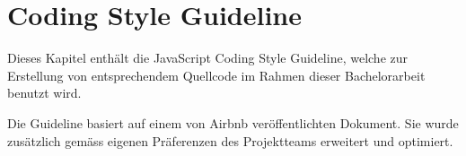 \chapter{Coding Style Guideline}
\label{sec:coding-guidelines}
Dieses Kapitel enthält die JavaScript Coding Style Guideline, welche zur Erstellung von entsprechendem Quellcode im Rahmen dieser Bachelorarbeit benutzt wird.

Die Guideline basiert auf einem von Airbnb \cite{Airbnb} veröffentlichten Dokument. Sie wurde zusätzlich gemäss eigenen Präferenzen \cite{JSGL} des Projektteams erweitert und optimiert.

